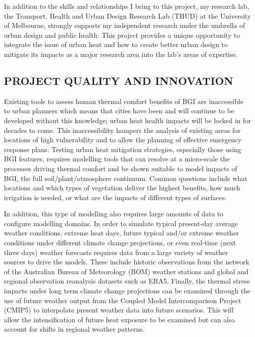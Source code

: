 In addition to the skills and relationships I bring to this project, my research lab, the Transport, Health and Urban Design Research Lab (THUD) at the University of Melbourne, strongly supports my independent research under the umbrella of urban design and public health. This project provides a unique opportunity to integrate the issue of urban heat and how to create better urban design to mitigate its impacts as a major research area into the lab's areas of expertise.

\subsection*{\TitleFont PROJECT QUALITY AND INNOVATION}


Existing tools to assess human thermal comfort benefits of BGI are inaccessible to urban planners which means that cities have been and will continue to be developed without this knowledge; urban heat health impacts will be locked in for decades to come. This inaccessibility hampers the analysis of existing areas for locations of high vulnerability and to allow the planning of effective emergency response plans. Testing urban heat mitigation strategies, especially those using BGI features, requires modelling tools that can resolve at a micro-scale the processes driving thermal comfort and be shown suitable to model impacts of BGI, the full soil/plant/atmosphere continuum. Common questions include what locations and which types of vegetation deliver the highest benefits, how much irrigation is needed, or what are the impacts of different types of surfaces.

In addition, this type of modelling also requires large amounts of data to configure modelling domains. In order to simulate typical present-day average weather conditions, extreme heat days, future typical and/or extreme weather conditions under different climate change projections, or even real-time (next three days) weather forecasts requires data from a large variety of weather sources to drive the models. These include historic observations from the network of the Australian Bureau of Meteorology (BOM) weather stations\cite{AuGovBOM2020} and global and regional observation reanalysis datasets such as ERA5\cite{Hersbach2020}. Finally, the thermal stress impacts under long term climate change projections can be examined through the use of future weather output from the Coupled Model Intercomparison Project (CMIP5)\cite{Taylor2012} to interpolate present weather data into future scenarios. This will allow the intensification of future heat exposure to be examined but can also account for shifts in regional weather patterns.

